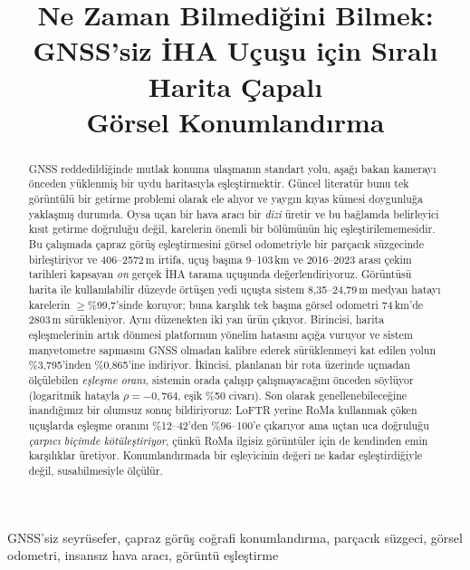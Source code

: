 \documentclass[conference]{IEEEtran}
\begin{document}
\title{Ne Zaman Bilmediğini Bilmek:\\
GNSS'siz İHA Uçuşu için Sıralı Harita Çapalı\\
Görsel Konumlandırma}

\author{\IEEEauthorblockN{}\IEEEauthorblockA{}}

\maketitle

\begin{abstract}
GNSS reddedildiğinde mutlak konuma ulaşmanın standart yolu, aşağı bakan
kamerayı önceden yüklenmiş bir uydu haritasıyla eşleştirmektir. Güncel
literatür bunu tek görüntülü bir getirme problemi olarak ele alıyor ve yaygın
kıyas kümesi doygunluğa yaklaşmış durumda. Oysa uçan bir hava aracı bir
\emph{dizi} üretir ve bu bağlamda belirleyici kısıt getirme doğruluğu değil,
karelerin önemli bir bölümünün hiç eşleştirilememesidir. Bu çalışmada çapraz
görüş eşleştirmesini görsel odometriyle bir parçacık süzgecinde birleştiriyor
ve 406--2572\,m irtifa, uçuş başına 9--103\,km ve 2016--2023 arası çekim
tarihleri kapsayan \emph{on} gerçek İHA tarama uçuşunda değerlendiriyoruz.
Görüntüsü harita ile kullanılabilir düzeyde örtüşen yedi uçuşta sistem
8,35--24,79\,m medyan hatayı karelerin $\geq$\%99,7'sinde koruyor; buna karşılık
tek başına görsel odometri 74\,km'de 2803\,m sürükleniyor. Aynı düzenekten iki
yan ürün çıkıyor. Birincisi, harita eşleşmelerinin artık dönmesi platformun
yönelim hatasını açığa vuruyor ve sistem manyetometre sapmasını GNSS olmadan
kalibre ederek sürüklenmeyi kat edilen yolun \%3,795'inden \%0,865'ine
indiriyor. İkincisi, planlanan bir rota üzerinde uçmadan ölçülebilen
\emph{eşleşme oranı}, sistemin orada çalışıp çalışmayacağını önceden
söylüyor (logaritmik hatayla $\rho=-0{,}764$, eşik \%50 civarı). Son olarak
genellenebileceğine inandığımız bir olumsuz sonuç bildiriyoruz: LoFTR yerine
RoMa kullanmak çöken uçuşlarda eşleşme oranını \%12--42'den \%96--100'e
çıkarıyor ama uçtan uca doğruluğu \emph{çarpıcı biçimde kötüleştiriyor},
çünkü RoMa ilgisiz görüntüler için de kendinden emin karşılıklar üretiyor.
Konumlandırmada bir eşleyicinin değeri ne kadar eşleştirdiğiyle değil,
susabilmesiyle ölçülür.
\end{abstract}

\begin{IEEEkeywords}
GNSS'siz seyrüsefer, çapraz görüş coğrafi konumlandırma, parçacık süzgeci,
görsel odometri, insansız hava aracı, görüntü eşleştirme
\end{IEEEkeywords}
\end{document}
